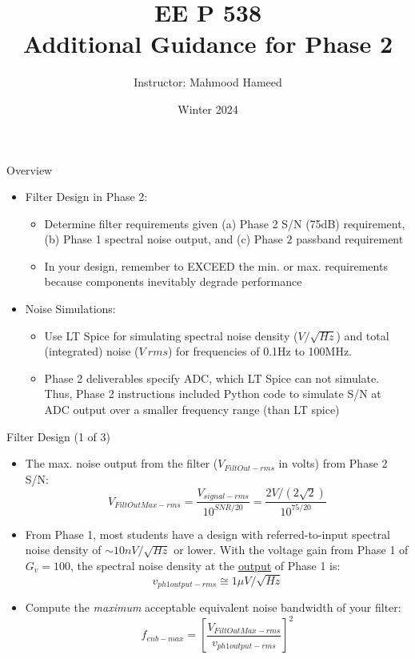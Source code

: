 \documentclass[aspectratio=169]{beamer}
\title{EE P 538 \\ Additional Guidance for Phase 2}
\author{Instructor: Mahmood Hameed}
\date{Winter 2024}
\institute{Electrical Engineering \\ University of Washington}
\begin{document}
\begin{frame}
    \titlepage
\end{frame}

\begin{frame}{Overview}
    \begin{itemize}
        \item Filter Design in Phase 2:
        \begin{itemize}
            \item Determine filter requirements given (a) Phase 2 S/N (75dB) requirement, (b) Phase 1 spectral noise output, and (c) Phase 2 passband requirement
            \item In your design, remember to EXCEED the min. or max. requirements because components inevitably degrade performance
        \end{itemize}
        \vspace{0.3cm}
        \item Noise Simulations:
        \begin{itemize}
            \item Use LT Spice for simulating spectral noise density ($V/\sqrt{Hz}$) and total (integrated) noise ($V\ rms$) for frequencies of 0.1Hz to 100MHz.
            \item Phase 2 deliverables specify ADC, which LT Spice can not simulate. Thus, Phase 2 instructions included Python code to simulate S/N at ADC output over a smaller frequency range (than LT spice)
        \end{itemize}
    \end{itemize}
\end{frame}

\begin{frame}{Filter Design (1 of 3)}
    \begin{itemize}
        \item The max. noise output from the filter ($V_{FiltOut-rms}$ in volts) from Phase 2 S/N:
        $$ V_{FiltOutMax-rms} = \frac{V_{signal-rms}}{10^{SNR/20}} = \frac{2V / (2\sqrt{2})}{10^{75/20}} $$
        \vspace{0.2cm}
        \item From Phase 1, most students have a design with referred-to-input spectral noise density of $\sim 10nV/\sqrt{Hz}$ or lower. With the voltage gain from Phase 1 of $G_v = 100$, the spectral noise density at the \underline{output} of Phase 1 is:
        $$ v_{ph1output-rms} \cong 1\mu V/\sqrt{Hz} $$
        \vspace{0.2cm}
        \item Compute the \textit{maximum} acceptable equivalent noise bandwidth of your filter:
        $$ f_{enb-max} = \left[ \frac{V_{FiltOutMax-rms}}{v_{ph1output-rms}} \right]^2 $$
    \end{itemize}
\end{frame}
\end{document}
